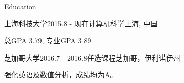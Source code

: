 \documentclass{resume} %
\begin{document}

\begin{rSection}{Education}

\begin{rSubsection}
  {上海科技大学}{2015.8 - 现在}{计算机科学}{上海, 中国}
    \item 总GPA 3.79, 专业GPA 3.89.
\end{rSubsection}


\begin{rSubsection}
  {芝加哥大学}{2016.7 - 2016.8}{任选课程}{芝加哥，伊利诺伊州}
    \item 强化英语及数值分析，成绩均为A。
\end{rSubsection}

\end{rSection}
\end{document}
